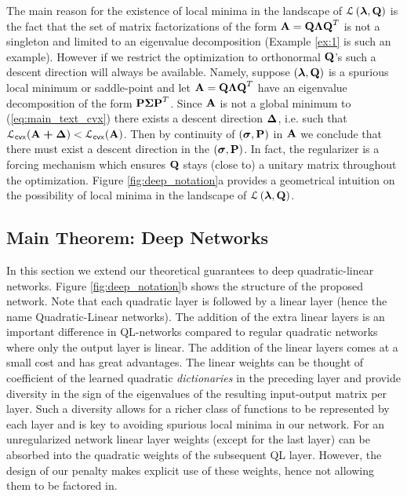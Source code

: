 \documentclass[11pt]{article}
\theoremstyle{plain}
\DeclareMathOperator*{\llq}{\ensuremath{\mathcal{L} \left(\V{\lambda},\Mx{Q}\right)} }
\theoremstyle{plain}
\numberwithin{equation}{section}
\numberwithin{lemma}{section}
\numberwithin{theorem}{section}
\numberwithin{corollary}{section}
\numberwithin{observation}{section}
\numberwithin{definition}{section}
\numberwithin{example}{section}
\begin{document}
The main reason for the existence of local minima in the landscape of $\llq$ is the fact that the set of matrix factorizations of the form $\Mx{A}= \Mx{Q\Lambda Q}^T$ is not a singleton and limited to an eigenvalue decomposition (Example \ref{ex:1} is such an example). However if we restrict the optimization to orthonormal $\Mx{Q}$'s such a descent direction will always be available. Namely, suppose $(\V{\lambda},\Mx{Q})$ is a spurious local minimum or saddle-point and let $\Mx{A} = \Mx{Q \Lambda Q}^T$ have an eigenvalue decomposition of the form $\Mx{P\Sigma P}^T$. Since $\Mx{A}$ is not a global minimum to (\ref{eq:main_text_cvx}) there exists a descent direction $\Mx{\Delta}$, i.e. such that $\mathcal{L}_{\sf cvx} (\Mx{A + \Delta})<\mathcal{L}_{\sf cvx} (\Mx{A})$. Then by continuity of $(\V{\sigma},\Mx{P})$ in $\Mx{A}$ we conclude that there must exist a descent direction in the $(\V{\sigma},\Mx{P})$. In fact, the regularizer is a forcing mechanism which ensures $\Mx{Q}$ stays (close to) a unitary matrix throughout the optimization. Figure \ref{fig:deep_notation}a provides a geometrical intuition on the possibility of local minima in the landscape of $\llq$.


\subsection{Main Theorem: Deep Networks} \label{sec:deep}
In this section we extend our theoretical guarantees to deep quadratic-linear networks. Figure \ref{fig:deep_notation}b shows the structure of the proposed network. Note that each quadratic layer is followed by a linear layer (hence the name Quadratic-Linear networks). The addition of the extra linear layers is an important difference in QL-networks compared to regular quadratic networks where only the output layer is linear. The addition of the linear layers comes at a small cost and has great advantages. The linear weights can be thought of coefficient of the learned quadratic \textit{dictionaries} in the preceding layer and provide diversity in the sign of the eigenvalues of the resulting input-output matrix per layer. Such a diversity allows for a richer class of functions to be represented by each layer and is key to avoiding spurious local minima in our network. For an unregularized network linear layer weights (except for the last layer) can be absorbed into the quadratic weights of the subsequent QL layer. However, the design of our penalty makes explicit use of these weights, hence not allowing them to be factored in.
\end{document}
